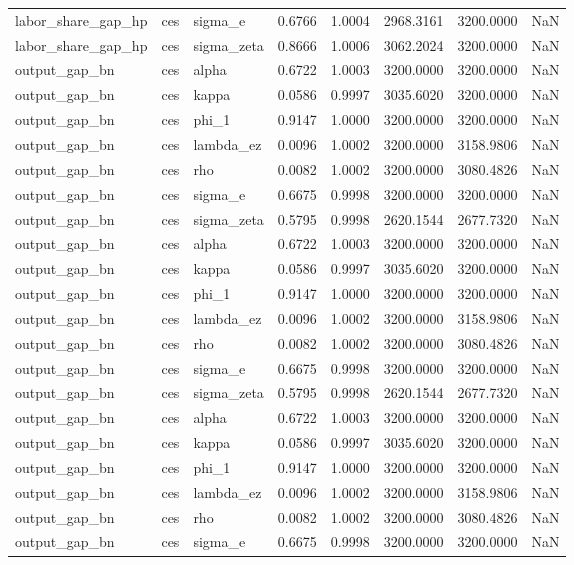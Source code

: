 \begin{tabular}{lllrrrrl}
labor\_share\_gap\_hp & ces & sigma\_e & 0.6766 & 1.0004 & 2968.3161 & 3200.0000 & NaN \\
labor\_share\_gap\_hp & ces & sigma\_zeta & 0.8666 & 1.0006 & 3062.2024 & 3200.0000 & NaN \\
output\_gap\_bn & ces & alpha & 0.6722 & 1.0003 & 3200.0000 & 3200.0000 & NaN \\
output\_gap\_bn & ces & kappa & 0.0586 & 0.9997 & 3035.6020 & 3200.0000 & NaN \\
output\_gap\_bn & ces & phi\_1 & 0.9147 & 1.0000 & 3200.0000 & 3200.0000 & NaN \\
output\_gap\_bn & ces & lambda\_ez & 0.0096 & 1.0002 & 3200.0000 & 3158.9806 & NaN \\
output\_gap\_bn & ces & rho & 0.0082 & 1.0002 & 3200.0000 & 3080.4826 & NaN \\
output\_gap\_bn & ces & sigma\_e & 0.6675 & 0.9998 & 3200.0000 & 3200.0000 & NaN \\
output\_gap\_bn & ces & sigma\_zeta & 0.5795 & 0.9998 & 2620.1544 & 2677.7320 & NaN \\
output\_gap\_bn & ces & alpha & 0.6722 & 1.0003 & 3200.0000 & 3200.0000 & NaN \\
output\_gap\_bn & ces & kappa & 0.0586 & 0.9997 & 3035.6020 & 3200.0000 & NaN \\
output\_gap\_bn & ces & phi\_1 & 0.9147 & 1.0000 & 3200.0000 & 3200.0000 & NaN \\
output\_gap\_bn & ces & lambda\_ez & 0.0096 & 1.0002 & 3200.0000 & 3158.9806 & NaN \\
output\_gap\_bn & ces & rho & 0.0082 & 1.0002 & 3200.0000 & 3080.4826 & NaN \\
output\_gap\_bn & ces & sigma\_e & 0.6675 & 0.9998 & 3200.0000 & 3200.0000 & NaN \\
output\_gap\_bn & ces & sigma\_zeta & 0.5795 & 0.9998 & 2620.1544 & 2677.7320 & NaN \\
output\_gap\_bn & ces & alpha & 0.6722 & 1.0003 & 3200.0000 & 3200.0000 & NaN \\
output\_gap\_bn & ces & kappa & 0.0586 & 0.9997 & 3035.6020 & 3200.0000 & NaN \\
output\_gap\_bn & ces & phi\_1 & 0.9147 & 1.0000 & 3200.0000 & 3200.0000 & NaN \\
output\_gap\_bn & ces & lambda\_ez & 0.0096 & 1.0002 & 3200.0000 & 3158.9806 & NaN \\
output\_gap\_bn & ces & rho & 0.0082 & 1.0002 & 3200.0000 & 3080.4826 & NaN \\
output\_gap\_bn & ces & sigma\_e & 0.6675 & 0.9998 & 3200.0000 & 3200.0000 & NaN \\

\end{tabular}
